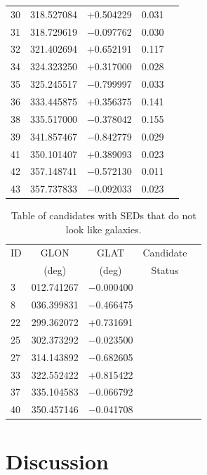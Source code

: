\documentclass[times,usenatbib]{mn2e}
\begin{document}
\begin{table}
\begin{center}
\begin{tabular}{lcccc}
30 & 318.527084 &   +0.504229 & 0.031 &   \\
31 & 318.729619 & $-$0.097762 & 0.030 &   \\
32 & 321.402694 &   +0.652191 & 0.117 &   \\
34 & 324.323250 &   +0.317000 & 0.028 &   \\
35 & 325.245517 & $-$0.799997 & 0.033 &   \\
36 & 333.445875 &   +0.356375 & 0.141 &   \\
38 & 335.517000 & $-$0.378042 & 0.155 &   \\
39 & 341.857467 & $-$0.842779 & 0.029 &   \\
41 & 350.101407 &   +0.389093 & 0.023 &   \\
42 & 357.148741 & $-$0.572130 & 0.011 &   \\
43 & 357.737833 & $-$0.092033 & 0.023 &   \\
\hline
\end{tabular}
\end{center}
\label{galaxy-catalogue}
\end{table}

\begin{table}
\begin{center}
\caption{Table of candidates with SEDs that do not look like galaxies.}
\begin{tabular}{lcccc}
\hline
ID & GLON & GLAT & Candidate \\
 & (deg) & (deg) & Status \\
\hline
 3 & 012.741267 & $-$0.000400 &  \\
 8 & 036.399831 & $-$0.466475 &  \\
22 & 299.362072 &   +0.731691 &  \\
25 & 302.373292 & $-$0.023500 &  \\
27 & 314.143892 & $-$0.682605 &  \\
33 & 322.552422 &   +0.815422 &  \\
37 & 335.104583 & $-$0.066792 &  \\
40 & 350.457146 & $-$0.041708 &  \\
\hline
\end{tabular}
\end{center}
\label{other-catalogue}
\end{table}

\section{Discussion}
\end{document}
